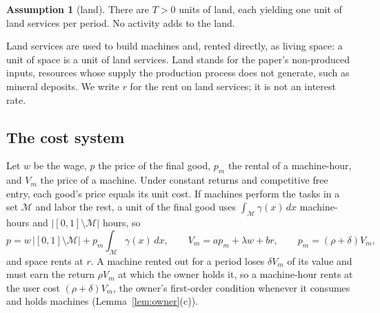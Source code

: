 \documentclass[12pt]{article}
\theoremstyle{plain}
\theoremstyle{definition}
\newtheorem{assumption}{Assumption}
\theoremstyle{remark}
\begin{document}
\begin{assumption}[land]\label{ass:land}
There are $T>0$ units of land, each yielding one unit of land services per period. No activity adds to the land.
\end{assumption}

Land services are used to build machines and, rented directly, as living space: a unit of space is a unit of land services. Land stands for the paper's non-produced inputs, resources whose supply the production process does not generate, such as mineral deposits.
We write $r$ for the rent on land services; it is not an interest rate.

\subsection{The cost system}\label{sec:costs}

Let $w$ be the wage, $p$ the price of the final good, $p_m$ the rental of a machine-hour, and $V_m$ the price of a machine. Under constant returns and competitive free entry, each good's price equals its unit cost.
If machines perform the tasks in a set $\mathcal M$ and labor the rest, a unit of the final good uses $\int_{\mathcal M}\gamma(x)\,dx$ machine-hours and $|[0,1]\setminus\mathcal M|$ hours, so
\begin{equation}\label{eq:unitcost}
p=w\,\bigl|[0,1]\setminus\mathcal M\bigr|+p_m\int_{\mathcal M}\gamma(x)\,dx,\qquad
V_m=ap_m+\lambda w+br,\qquad
p_m=(\rho+\delta)V_m,
\end{equation}
and space rents at $r$. A machine rented out for a period loses $\delta V_m$ of its value and must earn the return $\rho V_m$ at which the owner holds it, so a machine-hour rents at the user cost $(\rho+\delta)V_m$, the owner's first-order condition whenever it consumes and holds machines (Lemma~\ref{lem:owner}(c)).
\end{document}
